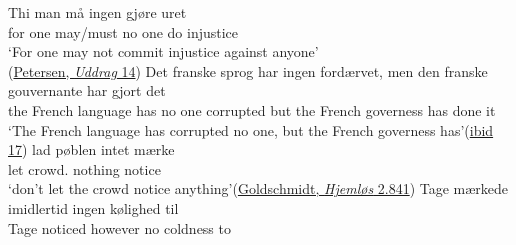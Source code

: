 \ea \label{ex:06-23}
\ea
 \gll Thi man må ingen gjøre uret\\
 for one may/must {no one} do injustice\\ %
\glt `For one may not commit injustice against anyone'\\\hfill(\href{https://archive.org/details/samledeafhandlin04peteuoft/page/122/mode/2up?q=%22thi+man+m%C3%A5+ingen+gore+uret%22&view=theater}{Petersen, \textit{Uddrag} 14}) %
\ex
 \gll Det franske sprog har ingen fordærvet, men den franske gouvernante har gjort det\\
 the French language has {no one} corrupted but the French governess has done it\\
\glt `The French language has corrupted no one, but the French governess has'\hfill(\href{https://books.google.co.jp/books?id=wolFAAAAcAAJ&pg=PA17&lpg=PA17&dq=%22Det+franske+sprog+har+ingen+ford%C3%A6rvet%22&source=bl&ots=yFxXLQduT9&sig=ACfU3U1CjhNS5gs6x629T5PjRf9PGxX_rg&hl=en&sa=X&ved=2ahUKEwjT0vD087aFAxWCePUHHWVOARAQ6AF6BAgJEAM#v=onepage&q=%22Det%20franske%20sprog%20har%20ingen%20ford%C3%A6rvet%22&f=false}{ibid 17})
\ex {}
 \gll lad pøblen intet mærke\\
 let crowd.\DEF{} nothing notice\\
\glt `don't let the crowd notice anything'\hfill(\href{https://tekster.kb.dk/text/adl-texts-goldschmidt03-root#idm139686918080032}{Goldschmidt, \textit{Hjemløs} 2.841})
\ex  \gll Tage mærkede imidlertid ingen kølighed til\\
 Tage noticed however no coldness to\\
